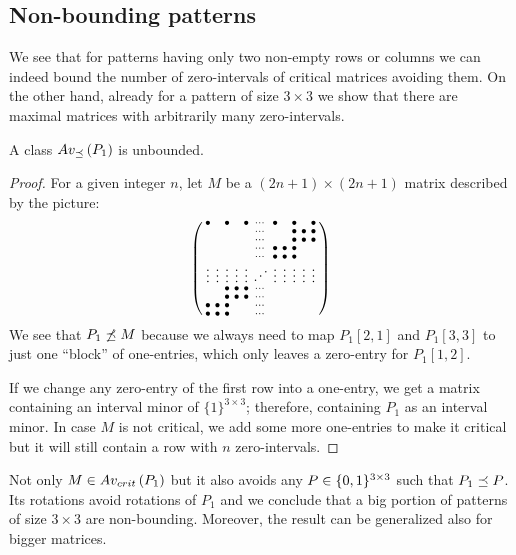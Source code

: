 \subsection{Non-bounding patterns}
\label{subsec:nonbound}
We see that for patterns having only two non-empty rows or columns we can indeed bound the number of zero-intervals of critical matrices avoiding them. On the other hand, already for a pattern of size $3\times3$ we show that there are maximal matrices with arbitrarily many zero-intervals.

\begin{lemma}
\label{lemma:manyints}
A class $Av_{\preceq}\left(P_1\right)$ is unbounded.
\end{lemma}
\begin{proof} For a given integer $n$, let $M$ be a $(2n+1)\times(2n+1)$ matrix described by the picture:
$$\smm{	\bullet& &\bullet& &\bullet&\cdots&\bullet& &\bullet& &\bullet\\
		 & & & & &\cdots& & &\bullet&\bullet&\bullet\\
		 & & & & &\cdots& & &\bullet&\bullet&\bullet\\
		 & & & & &\cdots&\bullet&\bullet&\bullet& & \\
		 & & & & &\cdots&\bullet&\bullet&\bullet& & \\
		\vdots&\vdots&\vdots&\vdots&\vdots&\Ddots&\vdots&\vdots&\vdots&\vdots&\vdots\\
		 & &\bullet&\bullet&\bullet&\cdots& & & & & \\
		 & &\bullet&\bullet&\bullet&\cdots& & & & & \\
		\bullet&\bullet&\bullet& & &\cdots& & & & & \\
		\bullet&\bullet&\bullet& & &\cdots& & & & & \\
		 }$$
We see that $P_1\not\preceq M$ because we always need to map $P_1[2,1]$ and $P_1[3,3]$ to just one ``block'' of one-entries, which only leaves a zero-entry for $P_1[1,2]$.

If we change any zero-entry of the first row into a one-entry, we get a matrix containing an interval minor of $\{1\}^{3\times3}$; therefore, containing $P_1$ as an interval minor. In case $M$ is not critical, we add some more one-entries to make it critical but it will still contain a row with $n$ zero-intervals.
\end{proof}

Not only $M\in Av_{crit}\left(P_1\right)$ but it also avoids any $P\in\{0,1\}^{3\times3}$ such that $P_1\preceq P$. Its rotations avoid rotations of $P_1$ and we conclude that a big portion of patterns of size $3\times3$ are non-bounding. Moreover, the result can be generalized also for bigger matrices.

